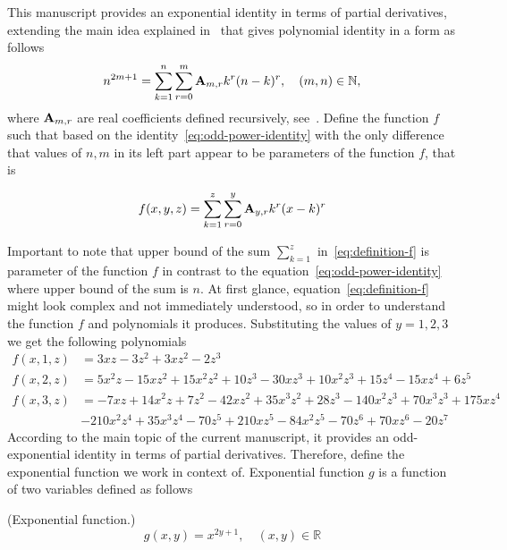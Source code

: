 This manuscript provides an exponential identity in terms of partial derivatives,
extending the main idea explained in~\cite{kolosov_2022} that gives polynomial identity in a form as follows
\begin{equation}
    n^{2m+1} = \sum_{k=1}^{n} \sum_{r=0}^{m} {\mathbf{A}} \sb{m,r} k^r (n-k)^r, \quad (m,n) \in \mathbb{N},
    \label{eq:odd-power-identity}
\end{equation}
where ${\mathbf{A}} \sb{m,r}$ are real coefficients defined recursively, see~\cite{kolosov2016link}.
Define the function $f$ such that based on the identity~\eqref{eq:odd-power-identity} with the only difference that
values of $n, m$ in its left part appear to be parameters of the function $f$, that is
\begin{definition}
    \begin{equation}
        f(x, y, z) = \sum_{k=1}^{z} \sum_{r=0}^{y} {\mathbf{A}} \sb{y,r} k^r (x-k)^r\label{eq:definition-f}
    \end{equation}
\end{definition}
Important to note that upper bound of the sum $\sum_{k=1}^{z}$ in~\eqref{eq:definition-f} is parameter of the function $f$ in contrast
to the equation~\eqref{eq:odd-power-identity} where upper bound of the sum is $n$.
At first glance, equation~\eqref{eq:definition-f} might look complex and not immediately understood, so in order to understand
the function $f$ and polynomials it produces.
Substituting the values of $y=1,2,3$ we get the following polynomials
\begin{align*}
    f(x, 1, z) &= 3 x z - 3 z^2 + 3 x z^2 - 2 z^3 \\
    f(x, 2, z) &= 5 x^2 z - 15 x z^2 + 15 x^2 z^2 + 10 z^3 - 30 x z^3 + 10 x^2 z^3 +
    15 z^4 - 15 x z^4 + 6 z^5 \\
    f(x, 3, z) &= -7 x z + 14 x^2 z + 7 z^2 - 42 x z^2 + 35 x^3 z^2 + 28 z^3 - 140 x^2 z^3 + 70 x^3 z^3 + 175 x z^4 \\
    &- 210 x^2 z^4 + 35 x^3 z^4 - 70 z^5 + 210 x z^5 - 84 x^2 z^5 - 70 z^6 + 70 x z^6 - 20 z^7
\end{align*}
According to the main topic of the current manuscript, it provides an odd-exponential identity
in terms of partial derivatives.
Therefore, define the exponential function we work in context of.
Exponential function $g$ is a function of two variables defined as follows
\begin{definition}(Exponential function.)
    \begin{equation}
        g(x, y) = x^{2y + 1}, \quad (x,y) \in \mathbb{R}
        \label{eq:definition-g}
    \end{equation}
\end{definition}
